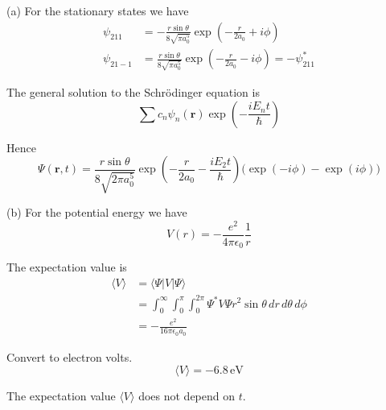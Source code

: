 


(a) For the stationary states we have
\begin{align*}
\psi_{211}&=-\frac{r\sin\theta}{8\sqrt{\pi a_0^5}}\exp\left(-\frac{r}{2a_0}+i\phi\right)
\\
\psi_{21-1}&=\frac{r\sin\theta}{8\sqrt{\pi a_0^5}}\exp\left(-\frac{r}{2a_0}-i\phi\right)=-\psi_{211}^*
\end{align*}

The general solution to the Schr\"odinger equation is
\begin{equation*}
\sum c_n\psi_n(\mathbf r)\exp\left(-\frac{iE_nt}{\hbar}\right)\tag{4.9}
\end{equation*}

Hence
\begin{equation*}
\Psi(\mathbf r,t)=\frac{r\sin\theta}{8\sqrt{2\pi a_0^5}}
\exp\left(-\frac{r}{2a_0}-\frac{iE_2t}{\hbar}\right)
\bigl(\exp(-i\phi)-\exp(i\phi)\bigr)
\end{equation*}

(b) For the potential energy we have
\begin{equation*}
V(r)=-\frac{e^2}{4\pi\epsilon_0}\frac{1}{r}\tag{4.52}
\end{equation*}

The expectation value is
\begin{align*}
\langle V\rangle&=\langle\Psi|V|\Psi\rangle
\\
&=\int_0^\infty\int_0^\pi\int_0^{2\pi}
\Psi^*V\Psi r^2\sin\theta\,dr\,d\theta\,d\phi
\\
&=-\frac{e^2}{16\pi\epsilon_0a_0}\tag{1}
\end{align*}

Convert to electron volts.
\begin{equation*}
\langle V\rangle=-6.8\,\text{eV}
\end{equation*}

The expectation value $\langle V\rangle$ does not depend on $t$.



